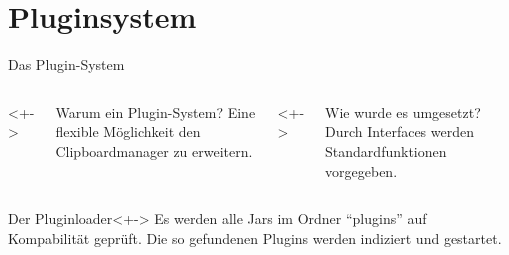 \section{Pluginsystem}
\begin{frame}{Das Plugin-System}
	\begin{columns}
		<+->
			\begin{block}{Warum ein Plugin-System?}
				Eine flexible Möglichkeit den Clipboardmanager zu erweitern.
			\end{block}
		<+->
			\begin{block}{Wie wurde es umgesetzt?}
				Durch Interfaces werden Standardfunktionen vorgegeben.
			\end{block} 
	\end{columns}
	\begin{block}{Der Pluginloader}<+->
		Es werden alle Jars im Ordner "`plugins"' auf Kompabilität geprüft. Die
		so gefundenen Plugins werden indiziert und gestartet.
	\end{block}
\end{frame}

